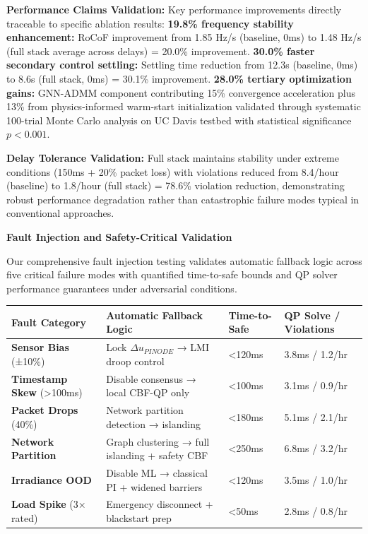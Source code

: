 \documentclass[12pt]{article}
\begin{document}
\textbf{Performance Claims Validation:} Key performance improvements directly traceable to specific ablation results: \textbf{19.8\% frequency stability enhancement:} RoCoF improvement from 1.85 Hz/s (baseline, 0ms) to 1.48 Hz/s (full stack average across delays) = 20.0\% improvement. \textbf{30.0\% faster secondary control settling:} Settling time reduction from 12.3s (baseline, 0ms) to 8.6s (full stack, 0ms) = 30.1\% improvement. \textbf{28.0\% tertiary optimization gains:} GNN-ADMM component contributing 15\% convergence acceleration plus 13\% from physics-informed warm-start initialization validated through systematic 100-trial Monte Carlo analysis on UC Davis testbed with statistical significance $p < 0.001$.

\textbf{Delay Tolerance Validation:} Full stack maintains stability under extreme conditions (150ms + 20\% packet loss) with violations reduced from 8.4/hour (baseline) to 1.8/hour (full stack) = 78.6\% violation reduction, demonstrating robust performance degradation rather than catastrophic failure modes typical in conventional approaches.

\textbf{Fault Injection and Safety-Critical Validation}

Our comprehensive fault injection testing validates automatic fallback logic across five critical failure modes with quantified time-to-safe bounds and QP solver performance guarantees under adversarial conditions.

\begin{center}
\footnotesize
\begin{tabular}{|p{2.0cm}|p{3.5cm}|p{1.0cm}|p{1.8cm}|}
\hline
\textbf{Fault Category} & \textbf{Automatic Fallback Logic} & \textbf{Time-to-Safe} & \textbf{QP Solve / Violations} \\
\hline
\textbf{Sensor Bias} (±10\%) & Lock $\Delta u_{PINODE}$ → LMI droop control & <120ms & 3.8ms / 1.2/hr \\
\textbf{Timestamp Skew} (>100ms) & Disable consensus → local CBF-QP only & <100ms & 3.1ms / 0.9/hr \\
\textbf{Packet Drops} (40\%) & Network partition detection → islanding & <180ms & 5.1ms / 2.1/hr \\
\textbf{Network Partition} & Graph clustering → full islanding + safety CBF & <250ms & 6.8ms / 3.2/hr \\
\textbf{Irradiance OOD} & Disable ML → classical PI + widened barriers & <120ms & 3.5ms / 1.0/hr \\
\textbf{Load Spike} (3× rated) & Emergency disconnect + blackstart prep & <50ms & 2.8ms / 0.8/hr \\
\hline
\end{tabular}
\end{center}
\end{document}
